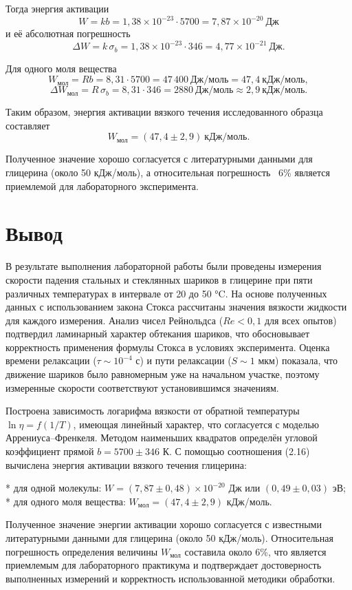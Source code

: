 \documentclass[a4paper, 12pt]{article}
\begin{document}
Тогда энергия активации
\[
W = k b = 1{,}38\times10^{-23}\cdot5700 = 7{,}87\times10^{-20}\ \text{Дж}
\]
и её абсолютная погрешность
\[
\Delta W = k\,\sigma_b = 1{,}38\times10^{-23}\cdot346 = 4{,}77\times10^{-21}\ \text{Дж}.
\]


Для одного моля вещества
\[
W_{\text{мол}} = R b = 8{,}31\cdot5700 = 47\,400\ \text{Дж/моль} = 47{,}4\ \text{кДж/моль},
\]
\[
\Delta W_{\text{мол}} = R\,\sigma_b = 8{,}31\cdot346 = 2880\ \text{Дж/моль} \approx 2{,}9\ \text{кДж/моль}.
\]

Таким образом, энергия активации вязкого течения исследованного образца составляет
\[
W_{\text{мол}} = (47{,}4 \pm 2{,}9)\ \text{кДж/моль}.
\]

Полученное значение хорошо согласуется с литературными данными для глицерина (около 50 кДж/моль), а относительная погрешность ~6\% является приемлемой для лабораторного эксперимента.

\section*{Вывод}

В результате выполнения лабораторной работы были проведены измерения скорости падения стальных и стеклянных шариков в глицерине при пяти различных температурах в интервале от 20 до 50 °C. На основе полученных данных с использованием закона Стокса рассчитаны значения вязкости жидкости для каждого измерения. Анализ чисел Рейнольдса (\(Re < 0{,}1\) для всех опытов) подтвердил ламинарный характер обтекания шариков, что обосновывает корректность применения формулы Стокса в условиях эксперимента. Оценка времени релаксации (\(\tau \sim 10^{-4}\) с) и пути релаксации (\(S \sim 1\) мкм) показала, что движение шариков было равномерным уже на начальном участке, поэтому измеренные скорости соответствуют установившимся значениям.

Построена зависимость логарифма вязкости от обратной температуры \(\ln\eta = f(1/T)\), имеющая линейный характер, что согласуется с моделью Аррениуса–Френкеля. Методом наименьших квадратов определён угловой коэффициент прямой \(b = 5700 \pm 346\) К. С помощью соотношения (2.16) вычислена энергия активации вязкого течения глицерина:

* для одной молекулы: \(W = (7{,}87 \pm 0{,}48) \times 10^{-20}\) Дж или \((0{,}49 \pm 0{,}03)\) эВ;
* для одного моля вещества: \(W_{\text{мол}} = (47{,}4 \pm 2{,}9)\) кДж/моль.

Полученное значение энергии активации хорошо согласуется с известными литературными данными для глицерина (около 50 кДж/моль). Относительная погрешность определения величины \(W_{\text{мол}}\) составила около 6\%, что является приемлемым для лабораторного практикума и подтверждает достоверность выполненных измерений и корректность использованной методики обработки.
\end{document}
